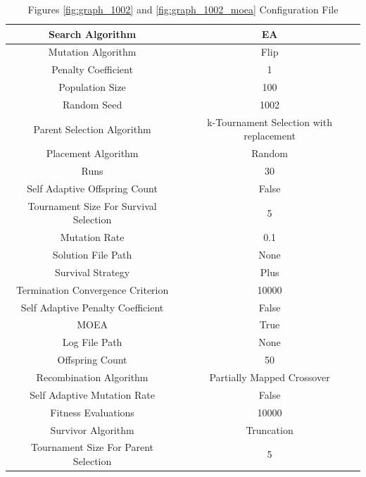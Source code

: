 \documentclass{standalone}
\begin{document}
\begin{table}[!htb]
	\centering
	\caption{Figures \ref{fig:graph_1002} and \ref{fig:graph_1002_moea} Configuration File}
	\label{tab:graph_1002}
	\begin{tabular}{| c | c |}
		\hline
		Search Algorithm		& EA		 \\
		\hline
		Mutation Algorithm		& Flip		 \\
		\hline
		Penalty Coefficient		& 1		 \\
		\hline
		Population Size		& 100		 \\
		\hline
		Random Seed		& 1002		 \\
		\hline
		Parent Selection Algorithm		& k-Tournament Selection with replacement		 \\
		\hline
		Placement Algorithm		& Random		 \\
		\hline
		Runs		& 30		 \\
		\hline
		Self Adaptive Offspring Count		& False		 \\
		\hline
		Tournament Size For Survival Selection		& 5		 \\
		\hline
		Mutation Rate		& 0.1		 \\
		\hline
		Solution File Path		& None		 \\
		\hline
		Survival Strategy		& Plus		 \\
		\hline
		Termination Convergence Criterion		& 10000		 \\
		\hline
		Self Adaptive Penalty Coefficient		& False		 \\
		\hline
		MOEA		& True		 \\
		\hline
		Log File Path		& None		 \\
		\hline
		Offspring Count		& 50		 \\
		\hline
		Recombination Algorithm		& Partially Mapped Crossover		 \\
		\hline
		Self Adaptive Mutation Rate		& False		 \\
		\hline
		Fitness Evaluations		& 10000		 \\
		\hline
		Survivor Algorithm		& Truncation		 \\
		\hline
		Tournament Size For Parent Selection		& 5		 \\
		\hline
	\end{tabular}
\end{table}
\end{document}
